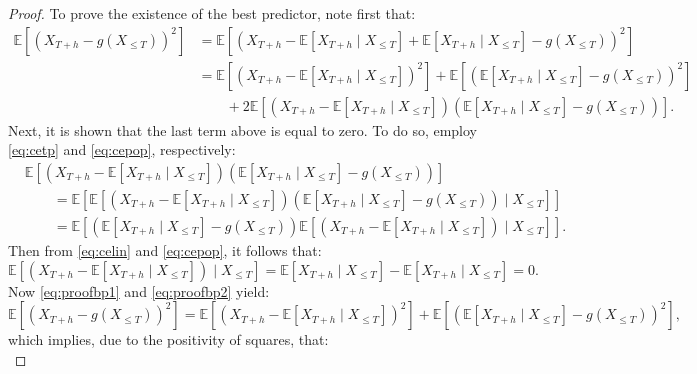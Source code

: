 \begin{proof}
To prove the existence of the best predictor, note first that:
\begin{align*}
    \mathbb{E}\left[(X_{T+h}-g(X_{\leq T}))^{2}\right]&=\mathbb{E}\left[(X_{T+h}-\mathbb{E}[X_{T+h}\mid X_{\leq T}]+\mathbb{E}[X_{T+h}\mid X_{\leq T}]-g(X_{\leq T}))^{2}\right]\\
    &=\mathbb{E}\left[(X_{T+h}-\mathbb{E}[X_{T+h}\mid X_{\leq T}])^{2}\right]+\mathbb{E}\left[(\mathbb{E}[X_{T+h}\mid X_{\leq T}]-g(X_{\leq T}))^{2}\right]\\
    &\qquad+2\mathbb{E}\left[(X_{T+h}-\mathbb{E}[X_{T+h}\mid X_{\leq T}])(\mathbb{E}[X_{T+h}\mid X_{\leq T}]-g(X_{\leq T}))\right].
\end{align*}
Next, it is shown that the last term above is equal to zero. To do so, employ \eqref{eq:cetp} and \eqref{eq:cepop}, respectively:
\begin{align}\label{eq:proofbp1}
    &\mathbb{E}\left[(X_{T+h}-\mathbb{E}[X_{T+h}\mid X_{\leq T}])(\mathbb{E}[X_{T+h}\mid X_{\leq T}]-g(X_{\leq T}))\right]\nonumber\\
    &\qquad=\mathbb{E}\left[\mathbb{E}\left[(X_{T+h}-\mathbb{E}[X_{T+h}\mid X_{\leq T}])(\mathbb{E}[X_{T+h}\mid X_{\leq T}]-g(X_{\leq T}))\mid X_{\leq T}\right]\right]\nonumber\\
    &\qquad=\mathbb{E}\left[(\mathbb{E}[X_{T+h}\mid X_{\leq T}]-g(X_{\leq T}))\mathbb{E}\left[(X_{T+h}-\mathbb{E}[X_{T+h}\mid X_{\leq T}])\mid X_{\leq T}\right]\right].
\end{align}
Then from \eqref{eq:celin} and \eqref{eq:cepop}, it follows that:
\begin{equation}\label{eq:proofbp2}
    \mathbb{E}\left[(X_{T+h}-\mathbb{E}[X_{T+h}\mid X_{\leq T}])\mid X_{\leq T}\right]=\mathbb{E}[X_{T+h}\mid X_{\leq T}]-\mathbb{E}[X_{T+h}\mid X_{\leq T}]=0.
\end{equation}
Now \eqref{eq:proofbp1} and \eqref{eq:proofbp2} yield:
\begin{equation*}
\mathbb{E}[(X_{T+h}-g(X_{\leq T}))^{2}]=\mathbb{E}\left[(X_{T+h}-\mathbb{E}[X_{T+h}\mid X_{\leq T}])^{2}\right]+\mathbb{E}\left[(\mathbb{E}[X_{T+h}\mid X_{\leq T}]-g(X_{\leq T}))^{2}\right],
\end{equation*}
which implies, due to the positivity of squares, that:
\begin{equation}\label{eq:proofbp3}

\end{equation}
\end{proof}
